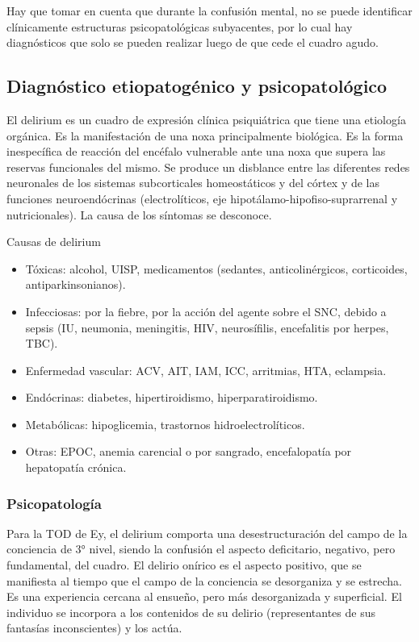 Hay que tomar en cuenta que durante la confusión mental, no se puede identificar clínicamente estructuras psicopatológicas subyacentes, por lo cual hay diagnósticos que solo se pueden realizar luego de que cede el cuadro agudo.

\subsection*{Diagnóstico etiopatogénico y psicopatológico}

El delirium es un cuadro de expresión clínica psiquiátrica que tiene una etiología orgánica. Es la manifestación de una noxa principalmente biológica. Es la forma inespecífica de reacción del encéfalo vulnerable ante una noxa que supera las reservas funcionales del mismo. Se produce un disblance entre las diferentes redes neuronales de los sistemas subcorticales homeostáticos y del córtex y de las funciones neuroendócrinas (electrolíticos, eje hipotálamo-hipofiso-suprarrenal y nutricionales). La causa de los síntomas se desconoce.

Causas de delirium
\begin{itemize}
	\item Tóxicas: alcohol, UISP, medicamentos (sedantes, anticolinérgicos, corticoides, antiparkinsonianos).
	\item Infecciosas: por la fiebre, por la acción del agente sobre el SNC, debido a sepsis (IU, neumonia, meningitis, HIV, neurosífilis, encefalitis por herpes, TBC).
	\item Enfermedad vascular: ACV, AIT, IAM, ICC, arritmias, HTA, eclampsia.
	\item Endócrinas: diabetes, hipertiroidismo, hiperparatiroidismo.
	\item Metabólicas: hipoglicemia, trastornos hidroelectrolíticos.
	\item Otras: EPOC, anemia carencial o por sangrado, encefalopatía por hepatopatía crónica.
\end{itemize}
\subsubsection*{Psicopatología}
Para la TOD de Ey, el delirium comporta una desestructuración del campo de la conciencia de 3° nivel, siendo la confusión el aspecto deficitario, negativo, pero fundamental, del cuadro. El delirio onírico es el aspecto positivo, que se manifiesta al tiempo que el campo de la conciencia se desorganiza y se estrecha. Es una experiencia cercana al ensueño, pero más desorganizada y superficial. El individuo se incorpora a los contenidos de su delirio (representantes de sus fantasías inconscientes) y los actúa.

